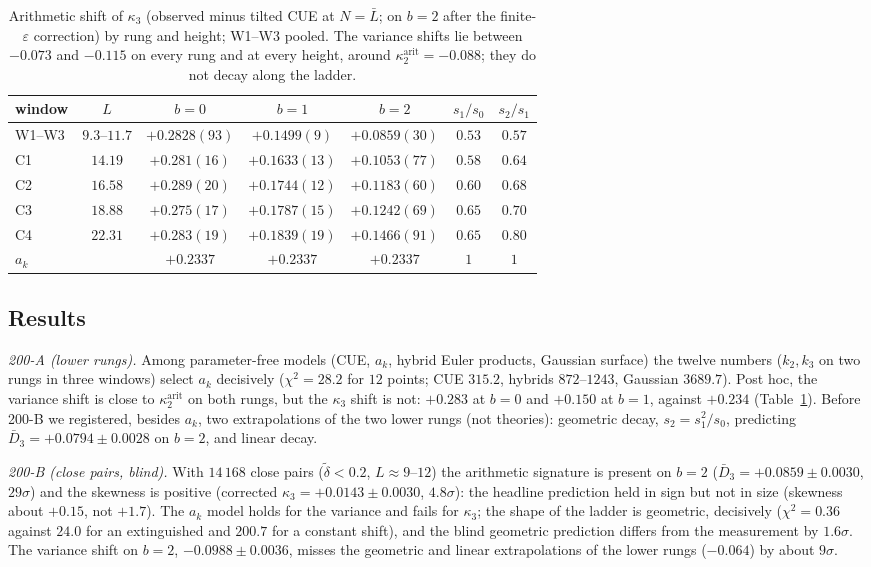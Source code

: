 \documentclass[12pt]{amsart}
\theoremstyle{remark}
\newcommand{\eps}{\varepsilon}
\newcommand{\1}{\mathbf{1}}
\begin{document}
\begin{table}[h]
\centering
\small
\begin{tabular}{lcccccc}
\toprule
window & $L$ & $b=0$ & $b=1$ & $b=2$ & $s_1/s_0$ & $s_2/s_1$\\
\midrule
W1--W3 & $9.3$--$11.7$ & $+0.2828(93)$ & $+0.1499(9)$ & $+0.0859(30)$ & $0.53$ & $0.57$\\
C1 & $14.19$ & $+0.281(16)$ & $+0.1633(13)$ & $+0.1053(77)$ & $0.58$ & $0.64$\\
C2 & $16.58$ & $+0.289(20)$ & $+0.1744(12)$ & $+0.1183(60)$ & $0.60$ & $0.68$\\
C3 & $18.88$ & $+0.275(17)$ & $+0.1787(15)$ & $+0.1242(69)$ & $0.65$ & $0.70$\\
C4 & $22.31$ & $+0.283(19)$ & $+0.1839(19)$ & $+0.1466(91)$ & $0.65$ & $0.80$\\
\midrule
$a_k$ & & $+0.2337$ & $+0.2337$ & $+0.2337$ & $1$ & $1$\\
\bottomrule
\end{tabular}
\caption{\label{tab:shifts}Arithmetic shift of $\kappa_3$ (observed minus
tilted CUE at $N=\bar L$; on $b=2$ after the finite-$\eps$ correction) by
rung and height; W1--W3 pooled. The variance shifts lie between $-0.073$
and $-0.115$ on every rung and at every height, around
$\kappa_2^{\mathrm{arit}}=-0.088$; they do not decay along the ladder.}
\end{table}

\subsection*{Results}
\emph{200-A (lower rungs).} Among parameter-free models (CUE, $a_k$,
hybrid Euler products, Gaussian surface) the twelve numbers ($k_2,k_3$ on
two rungs in three windows) select $a_k$ decisively ($\chi^2=28.2$ for $12$
points; CUE $315.2$, hybrids $872$--$1243$, Gaussian $3689.7$). Post hoc,
the variance shift is close to $\kappa_2^{\mathrm{arit}}$ on both rungs,
but the $\kappa_3$ shift is not: $+0.283$ at $b=0$ and $+0.150$ at $b=1$,
against $+0.234$ (Table~\ref{tab:shifts}). Before 200-B we registered,
besides $a_k$, two extrapolations of the two lower rungs (not theories):
geometric decay, $s_2=s_1^2/s_0$, predicting $\bar D_3=+0.0794\pm0.0028$ on
$b=2$, and linear decay.

\emph{200-B (close pairs, blind).} With $14\,168$ close pairs
($\tilde\delta<0.2$, $L\approx9$--$12$) the arithmetic signature is present
on $b=2$ ($\bar D_3=+0.0859\pm0.0030$, $29\sigma$) and the skewness is
positive (corrected $\kappa_3=+0.0143\pm0.0030$, $4.8\sigma$): the headline
prediction held in sign but not in size (skewness about $+0.15$, not
$+1.7$). The $a_k$ model holds for the variance and fails for $\kappa_3$;
the shape of the ladder is geometric, decisively ($\chi^2=0.36$ against
$24.0$ for an extinguished and $200.7$ for a constant shift), and the blind
geometric prediction differs from the measurement by $1.6\sigma$. The
variance shift on $b=2$, $-0.0988\pm0.0036$, misses the geometric and linear
extrapolations of the lower rungs ($-0.064$) by about $9\sigma$.
\end{document}
